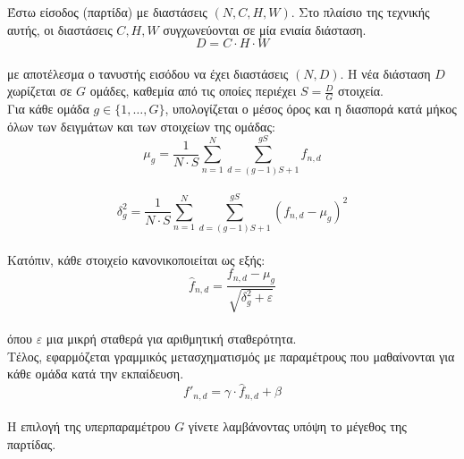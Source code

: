 \documentclass[12pt]{article}
\numberwithin{equation}{section}
\begin{document}
\noindent Έστω είσοδος (παρτίδα) με διαστάσεις \( (N, C, H, W) \). Στο πλαίσιο της τεχνικής αυτής, οι διαστάσεις \( C, H, W \) συγχωνεύονται σε μία ενιαία διάσταση.\\

\begin{equation}
D = C \cdot H \cdot W
\end{equation}\\

\noindent με αποτέλεσμα ο τανυστής εισόδου να έχει διαστάσεις \( (N, D) \). Η νέα διάσταση \( D \) χωρίζεται σε \( G \) ομάδες, καθεμία από τις οποίες περιέχει \( S = \frac{D}{G} \) στοιχεία.\\

\noindent Για κάθε ομάδα \( g \in \{1, \dots, G\} \), υπολογίζεται ο μέσος όρος και η διασπορά κατά μήκος όλων των δειγμάτων και των στοιχείων της ομάδας:\\

\begin{equation}
\mu_g = \frac{1}{N \cdot S} \sum_{n=1}^{N} \sum_{d=(g-1)S+1}^{gS} f_{n,d}
\end{equation}\\

\begin{equation}
\delta_g^2 = \frac{1}{N \cdot S} \sum_{n=1}^{N} \sum_{d=(g-1)S+1}^{gS} (f_{n,d} - \mu_g)^2
\end{equation}\\

\noindent Κατόπιν, κάθε στοιχείο κανονικοποιείται ως εξής:\\

\begin{equation}
\hat{f}_{n,d} = \frac{f_{n,d} - \mu_g}{\sqrt{\delta_g^2 + \varepsilon}}
\end{equation}\\

\noindent όπου \( \varepsilon \) μια μικρή σταθερά για αριθμητική σταθερότητα.\\

\noindent Τέλος, εφαρμόζεται γραμμικός μετασχηματισμός με παραμέτρους που μαθαίνονται για κάθε ομάδα κατά την εκπαίδευση.\\

\begin{equation}
f'_{n,d} = \gamma \cdot \hat{f}_{n,d} + \beta
\end{equation}\\

\noindent Η επιλογή της υπερπαραμέτρου \( G \) γίνετε λαμβάνοντας υπόψη το μέγεθος της παρτίδας.\\
\end{document}
